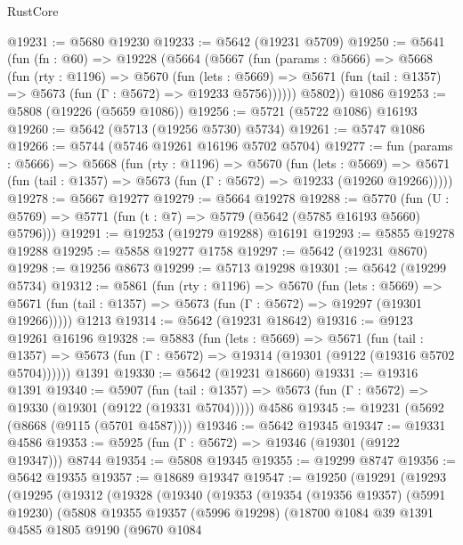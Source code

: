 \begin{lexlean}{RustCore}
\begin{coremodule}
@19231 := @5680 @19230
@19233 := @5642 (@19231 @5709)
@19250 := @5641
    (fun (fn : @60) =>
    @19228
      (@5664
        (@5667
          (fun (params : @5666) =>
          @5668
            (fun (rty : @1196) =>
            @5670
              (fun (lets : @5669) =>
              @5671 (fun (tail : @1357) => @5673 (fun (Γ : @5672) => @19233 @5756))))))
        @5802))
    @1086
@19253 := @5808 (@19226 (@5659 @1086))
@19256 := @5721 (@5722 @1086) @16193
@19260 := @5642 (@5713 (@19256 @5730) @5734)
@19261 := @5747 @1086
@19266 := @5744 (@5746 @19261 @16196 @5702 @5704)
@19277 := fun (params : @5666) =>
  @5668
    (fun (rty : @1196) =>
    @5670
      (fun (lets : @5669) =>
      @5671 (fun (tail : @1357) => @5673 (fun (Γ : @5672) => @19233 (@19260 @19266)))))
@19278 := @5667 @19277
@19279 := @5664 @19278
@19288 := @5770
    (fun (U : @5769) => @5771 (fun (t : @7) => @5779 (@5642 (@5785 @16193 @5660) @5796)))
@19291 := @19253 (@19279 @19288) @16191
@19293 := @5855 @19278 @19288
@19295 := @5858 @19277 @1758
@19297 := @5642 (@19231 @8670)
@19298 := @19256 @8673
@19299 := @5713 @19298
@19301 := @5642 (@19299 @5734)
@19312 := @5861
    (fun (rty : @1196) =>
    @5670
      (fun (lets : @5669) =>
      @5671 (fun (tail : @1357) => @5673 (fun (Γ : @5672) => @19297 (@19301 @19266)))))
    @1213
@19314 := @5642 (@19231 @18642)
@19316 := @9123 @19261 @16196
@19328 := @5883
    (fun (lets : @5669) =>
    @5671
      (fun (tail : @1357) =>
      @5673 (fun (Γ : @5672) => @19314 (@19301 (@9122 (@19316 @5702 @5704))))))
    @1391
@19330 := @5642 (@19231 @18660)
@19331 := @19316 @1391
@19340 := @5907
    (fun (tail : @1357) => @5673 (fun (Γ : @5672) => @19330 (@19301 (@9122 (@19331 @5704)))))
    @4586
@19345 := @19231 (@5692 (@8668 (@9115 (@5701 @4587))))
@19346 := @5642 @19345
@19347 := @19331 @4586
@19353 := @5925 (fun (Γ : @5672) => @19346 (@19301 (@9122 @19347))) @8744
@19354 := @5808 @19345
@19355 := @19299 @8747
@19356 := @5642 @19355
@19357 := @18689 @19347
@19547 := @19250
    (@19291
      (@19293
        (@19295
          (@19312
            (@19328
              (@19340
                (@19353
                  (@19354
                    (@19356 @19357)
                    (@5991 @19230)
                    (@5808
                      @19355
                      @19357
                      (@5996 @19298)
                      (@18700
                        @1084
                        @39
                        @1391
                        @4585
                        @1805
                        @9190
                        (@9670
                          @1084

\end{coremodule}
\end{lexlean}
